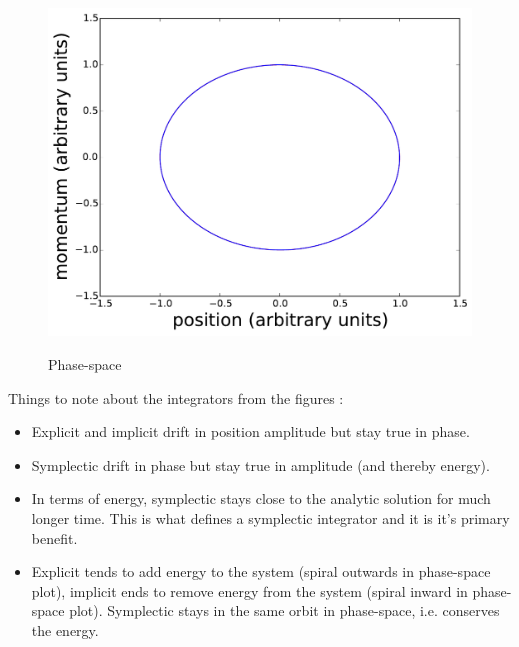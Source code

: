 \begin{figure}
{            \includegraphics[scale=0.24]{fig/ho/ho_phase-space_euler_symplectic.pdf}
            \label{fig:ho_phase-space_euler_symplectic}
        }
        \caption{Phase-space}
    \label{fig:ho_phase-space_euler}
\end{figure}

Things to note about the integrators from the figures :
\begin{itemize}
    \item Explicit and implicit drift in position amplitude but stay true in phase.
    \item Symplectic drift in phase but stay true in amplitude (and thereby energy).
    \item In terms of energy, symplectic stays close to the analytic solution for much longer time. This is what defines a symplectic integrator and it is it's primary benefit.
    \item Explicit tends to add energy to the system (spiral outwards in phase-space plot), implicit ends to remove energy from the system (spiral inward in phase-space plot). Symplectic stays in the same orbit in phase-space, i.e. conserves the energy.
\end{itemize}

